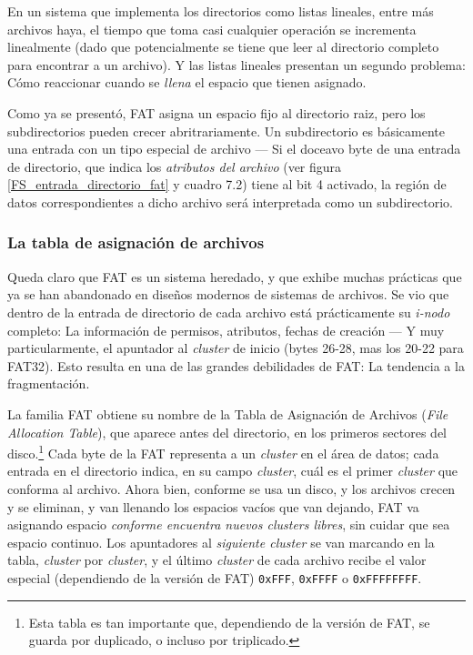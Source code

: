 \documentclass[11pt,fleqn]{book} %
\begin{document}
En un sistema que implementa los directorios como listas lineales,
entre más archivos haya, el tiempo que toma casi cualquier operación
se incrementa linealmente (dado que potencialmente se tiene que leer
al directorio completo para encontrar a un archivo). Y las listas
lineales presentan un segundo problema: Cómo reaccionar cuando se
\emph{llena} el espacio que tienen asignado.

Como ya se presentó, FAT asigna un espacio fijo al directorio raiz,
pero los subdirectorios pueden crecer abritrariamente. Un
subdirectorio es básicamente una entrada con un tipo especial de
archivo — Si el doceavo byte de una entrada de directorio, que indica
los \emph{atributos del archivo} (ver figura
\ref{FS_entrada_directorio_fat} y cuadro 7.2) tiene
al bit 4 activado, la región de datos correspondientes a dicho archivo
será interpretada como un subdirectorio.
\subsubsection{La tabla de asignación de archivos}
\label{sec-7-1-4-2}


Queda claro que FAT es un sistema heredado, y que exhibe muchas
prácticas que ya se han abandonado en diseños modernos de sistemas de
archivos. Se vio que dentro de la entrada de directorio de cada archivo
está prácticamente su \emph{i-nodo} completo: La información de permisos,
atributos, fechas de creación — Y muy particularmente, el apuntador
al \emph{cluster} de inicio (bytes 26-28, mas los 20-22 para FAT32). Esto
resulta en una de las grandes debilidades de FAT: La tendencia a la
fragmentación.

La familia FAT obtiene su nombre de la Tabla de Asignación de Archivos
(\emph{File Allocation Table}), que aparece antes del directorio, en los
primeros sectores del disco.\footnote{Esta tabla es tan importante que,
dependiendo de la versión de FAT, se guarda por duplicado, o incluso
por triplicado. } Cada byte de la FAT
representa a un \emph{cluster} en el área de datos; cada entrada en el
directorio indica, en su campo \emph{cluster}, cuál es el primer \emph{cluster}
que conforma al archivo. Ahora bien, conforme se usa un disco, y los
archivos crecen y se eliminan, y van llenando los espacios vacíos que
van dejando, FAT va asignando espacio \emph{conforme encuentra nuevos clusters libres}, sin cuidar que sea espacio continuo. Los apuntadores al
\emph{siguiente cluster} se van marcando en la tabla, \emph{cluster} por
\emph{cluster}, y el último \emph{cluster} de cada archivo recibe el valor
especial (dependiendo de la versión de FAT) \texttt{0xFFF}, \texttt{0xFFFF} o
\texttt{0xFFFFFFFF}.
\end{document}
